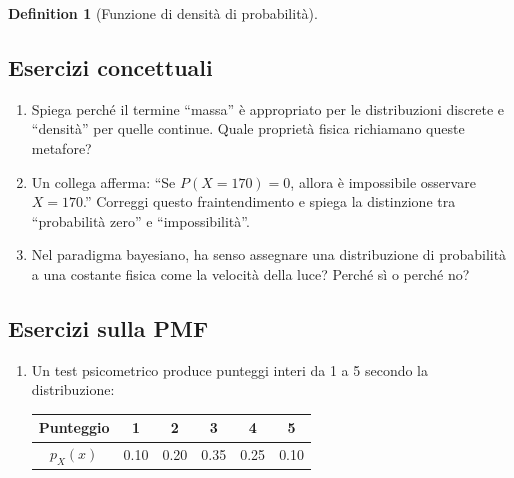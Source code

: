 \documentclass[
  letterpaper,
  DIV=11,
  numbers=noendperiod,
  oneside]{scrreprt}
\theoremstyle{definition}
\theoremstyle{plain}
\theoremstyle{definition}
\newtheorem{definition}{Definition}[chapter]
\theoremstyle{remark}
\begin{document}
\begin{definition}[Funzione di densità di
probabilità]
\begin{tcolorbox}[enhanced jigsaw, arc=.35mm, breakable, colbacktitle=quarto-callout-important-color!10!white, opacityback=0, toprule=.15mm, rightrule=.15mm, colback=white, opacitybacktitle=0.6, leftrule=.75mm, coltitle=black, bottomtitle=1mm, left=2mm, toptitle=1mm, title=\textcolor{quarto-callout-important-color}{\faExclamation}\hspace{0.5em}{Esercizi}, titlerule=0mm, bottomrule=.15mm, colframe=quarto-callout-important-color-frame]

\subsection*{Esercizi concettuali}\label{esercizi-concettuali-1}

\begin{enumerate}
\def\labelenumi{\arabic{enumi}.}
\item
  Spiega perché il termine ``massa'' è appropriato per le distribuzioni
  discrete e ``densità'' per quelle continue. Quale proprietà fisica
  richiamano queste metafore?
\item
  Un collega afferma: ``Se \(P(X = 170) = 0\), allora è impossibile
  osservare \(X = 170\).'' Correggi questo fraintendimento e spiega la
  distinzione tra ``probabilità zero'' e ``impossibilità''.
\item
  Nel paradigma bayesiano, ha senso assegnare una distribuzione di
  probabilità a una costante fisica come la velocità della luce? Perché
  sì o perché no?
\end{enumerate}

\subsection*{Esercizi sulla PMF}\label{esercizi-sulla-pmf}

\begin{enumerate}
\def\labelenumi{\arabic{enumi}.}
\setcounter{enumi}{3}
\item
  Un test psicometrico produce punteggi interi da 1 a 5 secondo la
  distribuzione:

  \begin{longtable}[]{@{}cccccc@{}}
  \toprule\noalign{}
  Punteggio & 1 & 2 & 3 & 4 & 5 \\
  \midrule\noalign{}
  \endhead
  \bottomrule\noalign{}
  \endlastfoot
  \(p_X(x)\) & 0.10 & 0.20 & 0.35 & 0.25 & 0.10 \\
  \end{longtable}


\end{enumerate}
\end{tcolorbox}
\end{definition}
\end{document}

